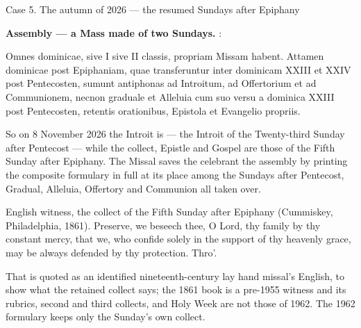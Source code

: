 \begin{casebox}{Case 5. The autumn of 2026 --- the resumed Sundays after
Epiphany}
\begin{steps}
\item \textbf{Assembly --- a Mass made of two Sundays.} :

\begin{rulebox}{}
Omnes dominicae, sive I sive II classis, propriam Missam habent. Attamen
dominicae post Epiphaniam, quae transferuntur inter dominicam XXIII et XXIV
post Pentecosten, sumunt antiphonas ad Introitum, ad Offertorium et ad
Communionem, necnon graduale et Alleluia cum suo versu a dominica XXIII post
Pentecosten, retentis orationibus, Epistola et Evangelio propriis.
\end{rulebox}

So on 8 November 2026 the Introit is  --- the Introit of the Twenty-third Sunday after Pentecost
--- while the collect, Epistle and Gospel are those of the Fifth Sunday after
Epiphany. The Missal saves the celebrant the assembly by printing the composite
formulary in full at its place among the Sundays after Pentecost, Gradual,
Alleluia, Offertory and Communion all taken over.

\end{steps}

\begin{witnesstext}{English witness, the collect of the Fifth Sunday after
Epiphany (Cummiskey, Philadelphia, 1861).}
Preserve, we beseech thee, O Lord, thy family by thy constant mercy, that we,
who confide solely in the support of thy heavenly grace, may be always defended
by thy protection. Thro'.
\end{witnesstext}

\noindent
That is quoted as an identified nineteenth-century lay hand missal's English,
to show what the retained collect says; the 1861 book is a pre-1955 witness and
its rubrics, second and third collects, and Holy Week are not those of 1962.
The 1962 formulary keeps only the Sunday's own collect.


\end{casebox}
